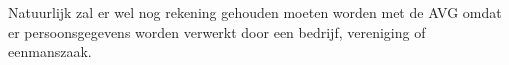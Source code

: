 Natuurlijk zal er wel nog rekening gehouden moeten worden met de AVG omdat er persoonsgegevens worden verwerkt door een bedrijf, vereniging of eenmanszaak. \autocite{gba2019videoparlofoon}






